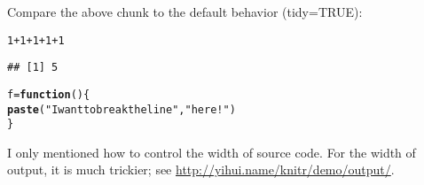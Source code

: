 \documentclass{article}\usepackage[]{graphicx}\usepackage[]{color}
\makeatletter
\newcommand{\hlnum}[1]{\textcolor[rgb]{0.686,0.059,0.569}{#1}}%
\newcommand{\hlstr}[1]{\textcolor[rgb]{0.192,0.494,0.8}{#1}}%
\newcommand{\hlopt}[1]{\textcolor[rgb]{0,0,0}{#1}}%
\newcommand{\hlstd}[1]{\textcolor[rgb]{0.345,0.345,0.345}{#1}}%
\newcommand{\hlkwa}[1]{\textcolor[rgb]{0.161,0.373,0.58}{\textbf{#1}}}%
\newcommand{\hlkwb}[1]{\textcolor[rgb]{0.69,0.353,0.396}{#1}}%
\newcommand{\hlkwd}[1]{\textcolor[rgb]{0.737,0.353,0.396}{\textbf{#1}}}%
\newenvironment{kframe}{%
 \def\at@end@of@kframe{}%
 \ifinner\ifhmode%
  \def\at@end@of@kframe{\end{minipage}}%
  \begin{minipage}{\columnwidth}%
 \fi\fi%
 \def\FrameCommand##1{\hskip\@totalleftmargin \hskip-\fboxsep
 \colorbox{shadecolor}{##1}\hskip-\fboxsep
     \hskip-\linewidth \hskip-\@totalleftmargin \hskip\columnwidth}%
 \MakeFramed {\advance\hsize-\width
   \@totalleftmargin\z@ \linewidth\hsize
   \@setminipage}}%
 {\par\unskip\endMakeFramed%
 \at@end@of@kframe}
\newenvironment{knitrout}{}{} %
\makeatother
\begin{document}
Compare the above chunk to the default behavior (tidy=TRUE):

\begin{knitrout}
\color{fgcolor}\begin{kframe}
\begin{alltt}
\hlnum{1} \hlopt{+} \hlnum{1} \hlopt{+} \hlnum{1} \hlopt{+} \hlnum{1} \hlopt{+} \hlnum{1}
\end{alltt}
\begin{verbatim}
## [1] 5
\end{verbatim}
\begin{alltt}
\hlstd{f} \hlkwb{=} \hlkwa{function}\hlstd{() \{}
    \hlkwd{paste}\hlstd{(}\hlstr{"I want to break the line"}\hlstd{,} \hlstr{"here!"}\hlstd{)}
\hlstd{\}}
\end{alltt}
\end{kframe}
\end{knitrout}


I only mentioned how to control the width of source code. For the width of output, it is much trickier; see \url{http://yihui.name/knitr/demo/output/}.
\end{document}
